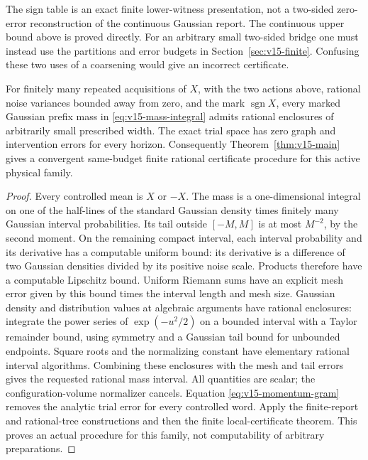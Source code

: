 The sign table is an exact finite lower-witness presentation, not a
two-sided zero-error reconstruction of the continuous Gaussian report.
The continuous upper bound above is proved directly. For an arbitrary
small two-sided bridge one must instead use the partitions and error
budgets in Section~\ref{sec:v15-finite}. Confusing these two uses of a
coarsening would give an incorrect certificate.

\begin{proposition}
\label{prop:v15-cell-data}
For finitely many repeated acquisitions of $X$, with the two actions
above, rational noise variances bounded away from zero, and the mark
$\operatorname{sgn}X$, every marked Gaussian prefix mass in
\eqref{eq:v15-mass-integral} admits rational enclosures of arbitrarily
small prescribed width. The exact trial space has zero graph and
intervention errors for every horizon. Consequently
Theorem~\ref{thm:v15-main} gives a convergent same-budget finite rational
certificate procedure for this active physical family.
\end{proposition}
\begin{proof}
Every controlled mean is $X$ or $-X$. The mass is a one-dimensional
integral on one of the half-lines of the standard Gaussian density
times finitely many Gaussian interval probabilities. Its tail outside
$[-M,M]$ is at most $M^{-2}$, by the second moment. On the remaining
compact interval, each interval probability and its derivative has a
computable uniform bound: its derivative is a difference of two
Gaussian densities divided by its positive noise scale. Products
therefore have a computable Lipschitz bound. Uniform Riemann sums have
an explicit mesh error given by this bound times the interval length
and mesh size. Gaussian density and distribution values at algebraic
arguments have rational enclosures: integrate the power series of
$\exp(-u^2/2)$ on a bounded interval with a Taylor remainder bound,
using symmetry and a Gaussian tail bound for unbounded endpoints.
Square roots and the normalizing constant have elementary rational
interval algorithms. Combining these enclosures with the mesh and
tail errors gives the requested rational mass interval. All quantities
are scalar; the configuration-volume normalizer cancels. Equation
\eqref{eq:v15-momentum-gram} removes the analytic trial error for every
controlled word. Apply the finite-report and rational-tree constructions
and then the finite local-certificate theorem. This proves an actual
procedure for this family, not computability of arbitrary preparations.
\end{proof}

